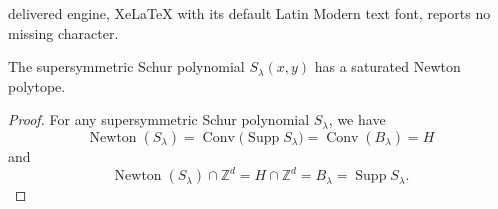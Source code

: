 \documentclass[10pt,a4paper]{amsart}
\DeclareMathOperator{\Conv}{Conv}
\DeclareMathOperator{\Newton}{Newton}
\DeclareMathOperator{\Supp}{Supp}
\newcommand{\Z}{\mathbb{Z}}
\begin{document}
delivered engine, XeLaTeX with its default Latin Modern text font, reports no missing character.
\begin{theorem}\label{Main}
The supersymmetric Schur polynomial $S_\lambda(x,y)$ has a saturated Newton polytope.
\end{theorem}

\begin{proof}
For any supersymmetric Schur polynomial $S_\lambda$, we have 
\[
   \Newton(S_\lambda)
        =\Conv\bigl(\Supp S_\lambda\bigr)
        =\Conv(B_\lambda)
        =H
        \]
and
\[
   \Newton(S_\lambda)\cap\Z^{d}
        =H\cap\Z^{d}
        =B_\lambda
        =\Supp S_\lambda.
\]

\end{proof}
\end{document}
